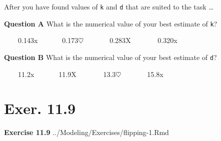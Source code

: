 \documentclass[
  letterpaper,
  DIV=11,
  numbers=noendperiod,
  oneside]{article}
\begin{document}
\begin{multicols}{2}
\begin{table}
\begin{minipage}[t]{\linewidth}
{}

\end{minipage}%
\newline
\begin{minipage}[t]{\linewidth}

{\centering 

After you have found values of \texttt{k} and \texttt{d} that are suited
to the task \ldots{}

}

\end{minipage}%
\newline
\begin{minipage}[t]{\linewidth}

{\centering 

\textbf{Question A} What is the numerical value of your best estimate of
\texttt{k}?

~~~~{0.143{x}}~~~~~~~{0.173{\(\heartsuit\ \)}}~~~~~~~{0.283{︎X
}}~~~~~~~{0.320{x}}

}

\end{minipage}%
\newline
\begin{minipage}[t]{\linewidth}

{\centering 

\textbf{Question B} What is the numerical value of your best estimate of
\texttt{d}?

~~~~{11.2{x}}~~~~~~~{11.9{︎X
}}~~~~~~~{13.3{\(\heartsuit\ \)}}~~~~~~~{15.8{x}}

}

\end{minipage}%
\newline
\begin{minipage}[t]{\linewidth}

{\centering 

\hypertarget{exer.-11.9}{%
\section*{Exer. 11.9}\label{exer.-11.9}}

\textbf{Exercise 11.9} ../Modeling/Exercises/flipping-1.Rmd

}

\end{minipage}%
\newline
\begin{minipage}[t]{\linewidth}

{\centering 

}
\end{minipage}
\end{table}
\end{multicols}
\end{document}
